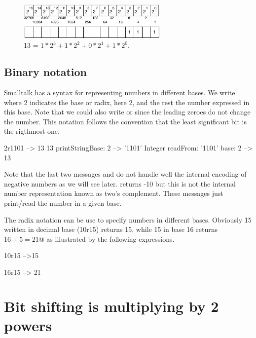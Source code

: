 \documentclass[a4paper,10pt,twoside]{book}
\begin{document}
\begin{figure}[h]
\begin{center}
\includegraphics[width=0.65\textwidth]{16bits-number13}
\caption{13 = $1*2^{3} + 1*2^{2} + 0*2^1 +1*2^{0}$.\label{16bits-number13}}
\end{center}
\end{figure}


\subsection*{Binary notation}
Smalltalk has a syntax for representing numbers in different bases. We write  where 2 indicates the base or radix, here 2, and the rest the number expressed in this base. Note that we could also write  or  since the leading zeroes do not change the number.
This notation follows the convention that the least significant bit is the rigthmost one. 

\begin{code}{}
2r1101
	--> 13
13 printStringBase: 2
	--> '1101'	
Integer readFrom: '1101' base: 2 	
	--> 13
\end{code}

Note that the last two messages  and  do not handle well the internal encoding of negative numbers as we will see later.  returns -10 but this is not the internal number representation known as two's complement. These messages just print/read the number in a given base. 

The radix notation can be use to specify numbers in different bases. Obviously 15 written in decimal base (10r15) returns 15, while 15 in base 16 returns $16 + 5 = 21@$ as illustrated by the following expressions. 

\begin{code}{}
10r15 
    -->15

16r15 
	--> 21
\end{code}

\section{Bit shifting is multiplying by 2 powers}
\end{document}

